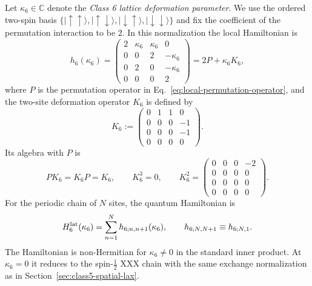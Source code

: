 Let $\kappa_6\in\mathbb C$ denote the \emph{Class 6 lattice deformation
parameter}.  We use the ordered two-spin basis
$\{|\!\uparrow\uparrow\rangle,|\!\uparrow\downarrow\rangle,
|\!\downarrow\uparrow\rangle,|\!\downarrow\downarrow\rangle\}$
and fix the coefficient of the permutation interaction to be $2$.
In this normalization the local Hamiltonian is
\begin{equation}
h_6(\kappa_6)
=
\begin{pmatrix}
2&\kappa_6&\kappa_6&0\\
0&0&2&-\kappa_6\\
0&2&0&-\kappa_6\\
0&0&0&2
\end{pmatrix}
=2P+\kappa_6 K_6,
\label{eq:class6-local-hamiltonian}
\end{equation}
where $P$ is the permutation operator in
Eq.~\eqref{eq:local-permutation-operator}, and the two-site deformation
operator $K_6$ is defined by
\begin{equation}
K_6
:=
\begin{pmatrix}
0&1&1&0\\
0&0&0&-1\\
0&0&0&-1\\
0&0&0&0
\end{pmatrix}.
\label{eq:class6-K-definition}
\end{equation}
Its algebra with $P$ is
\begin{equation}
PK_6=K_6P=K_6,
\qquad K_6^3=0,
\qquad
K_6^2=
\begin{pmatrix}
0&0&0&-2\\
0&0&0&0\\
0&0&0&0\\
0&0&0&0
\end{pmatrix}.
\label{eq:class6-PK-algebra}
\end{equation}
For the periodic chain of $N$ sites, the quantum Hamiltonian is
\begin{equation}
H^{\rm lat}_6(\kappa_6)
=\sum_{n=1}^{N}h_{6;n,n+1}(\kappa_6),
\qquad h_{6;N,N+1}\equiv h_{6;N,1}.
\label{eq:class6-lattice-hamiltonian}
\end{equation}
The Hamiltonian is non-Hermitian for $\kappa_6\neq0$ in the standard inner
product.  At $\kappa_6=0$ it reduces to the spin-$\tfrac12$ XXX chain with
the same exchange normalization as in Section~\ref{sec:class5-spatial-lax}.

